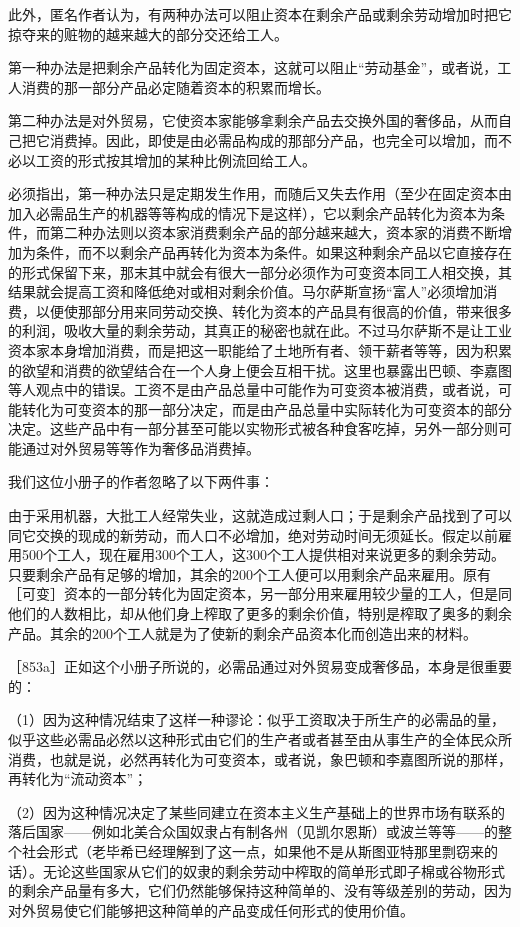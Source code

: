 此外，匿名作者认为，有两种办法可以阻止资本在剩余产品或剩余劳动增加时把它掠夺来的赃物的越来越大的部分交还给工人。

第一种办法是把剩余产品转化为固定资本，这就可以阻止“劳动基金”，或者说，工人消费的那一部分产品必定随着资本的积累而增长。

第二种办法是对外贸易，它使资本家能够拿剩余产品去交换外国的奢侈品，从而自己把它消费掉。因此，即使是由必需品构成的那部分产品，也完全可以增加，而不必以工资的形式按其增加的某种比例流回给工人。

必须指出，第一种办法只是定期发生作用，而随后又失去作用（至少在固定资本由加入必需品生产的机器等等构成的情况下是这样），它以剩余产品转化为资本为条件，而第二种办法则以资本家消费剩余产品的部分越来越大，资本家的消费不断增加为条件，而不以剩余产品再转化为资本为条件。如果这种剩余产品以它直接存在的形式保留下来，那末其中就会有很大一部分必须作为可变资本同工人相交换，其结果就会提高工资和降低绝对或相对剩余价值。马尔萨斯宣扬“富人”必须增加消费，以便使那部分用来同劳动交换、转化为资本的产品具有很高的价值，带来很多的利润，吸收大量的剩余劳动，其真正的秘密也就在此。不过马尔萨斯不是让工业资本家本身增加消费，而是把这一职能给了土地所有者、领干薪者等等，因为积累的欲望和消费的欲望结合在一个人身上便会互相干扰。这里也暴露出巴顿、李嘉图等人观点中的错误。工资不是由产品总量中可能作为可变资本被消费，或者说，可能转化为可变资本的那一部分决定，而是由产品总量中实际转化为可变资本的部分决定。这些产品中有一部分甚至可能以实物形式被各种食客吃掉，另外一部分则可能通过对外贸易等等作为奢侈品消费掉。

我们这位小册子的作者忽略了以下两件事：

由于采用机器，大批工人经常失业，这就造成过剩人口；于是剩余产品找到了可以同它交换的现成的新劳动，而人口不必增加，绝对劳动时间无须延长。假定以前雇用500个工人，现在雇用300个工人，这300个工人提供相对来说更多的剩余劳动。只要剩余产品有足够的增加，其余的200个工人便可以用剩余产品来雇用。原有［可变］资本的一部分转化为固定资本，另一部分用来雇用较少量的工人，但是同他们的人数相比，却从他们身上榨取了更多的剩余价值，特别是榨取了奥多的剩余产品。其余的200个工人就是为了使新的剩余产品资本化而创造出来的材料。

［853a］正如这个小册子所说的，必需品通过对外贸易变成奢侈品，本身是很重要的：

（1）因为这种情况结束了这样一种谬论：似乎工资取决于所生产的必需品的量，似乎这些必需品必然以这种形式由它们的生产者或者甚至由从事生产的全体民众所消费，也就是说，必然再转化为可变资本，或者说，象巴顿和李嘉图所说的那样，再转化为“流动资本”；

（2）因为这种情况决定了某些同建立在资本主义生产基础上的世界市场有联系的落后国家——例如北美合众国奴隶占有制各州（见凯尔恩斯）或波兰等等——的整个社会形式（老毕希已经理解到了这一点，如果他不是从斯图亚特那里剽窃来的话）。无论这些国家从它们的奴隶的剩余劳动中榨取的简单形式即子棉或谷物形式的剩余产品量有多大，它们仍然能够保持这种简单的、没有等级差别的劳动，因为对外贸易使它们能够把这种简单的产品变成任何形式的使用价值。

